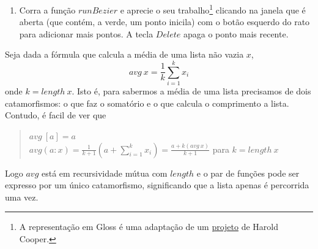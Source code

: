 \documentclass[a4paper]{article}
\newcommand{\Conid}[1]{\mathit{#1}}
\newcommand{\Varid}[1]{\mathit{#1}}
\begin{document}
\begin{enumerate}
  \item Corra a função \ensuremath{\Varid{runBezier}} e aprecie o seu trabalho\footnote{%
        A representação em Gloss é uma adaptação de um
        \href{https://github.com/hrldcpr/Bezier.hs}{projeto}
        de Harold Cooper.} clicando na janela que é aberta (que contém, a verde, um ponto
        inicila) com o botão esquerdo do rato para adicionar mais pontos.
        A tecla \ensuremath{\Conid{Delete}} apaga o ponto mais recente.

\end{enumerate}

\Problema

Seja dada a fórmula que calcula a média de uma lista não vazia $x$,
\begin{equation}
avg\ x = \frac 1 k\sum_{i=1}^{k} x_i
\end{equation}
onde $k=length\ x$. Isto é, para sabermos a média de uma lista precisamos de dois catamorfismos: o que faz o somatório e o que calcula o comprimento a lista.
Contudo, é facil de ver que
\begin{quote}
	$avg\ [a]=a$
\\
	$avg (a:x) = \frac 1 {k+1}(a+\sum_{i=1}^{k} x_i) = \frac{a+k(avg\ x)}{k+1}$ para $k=length\ x$
\end{quote}
Logo $avg$ está em recursividade mútua com $length$ e o par de funções pode ser expresso por um único catamorfismo, significando que a lista apenas é percorrida uma vez.
\end{document}
